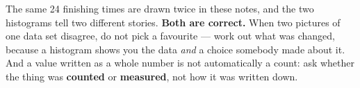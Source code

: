\documentclass[12pt]{article}
\begin{document}
\vspace{0.14in}

\boxguard[8]
\begin{remindbox}
\small
The same 24 finishing times are drawn twice in these notes, and the two histograms tell two
different stories. \textbf{Both are correct.} When two pictures of one data set disagree, do not
pick a favourite --- work out what was changed, because a histogram shows you the data \emph{and}
a choice somebody made about it. And a value written as a whole number is not automatically a
count: ask whether the thing was \textbf{counted} or \textbf{measured}, not how it was written
down.
\end{remindbox}
\end{document}
